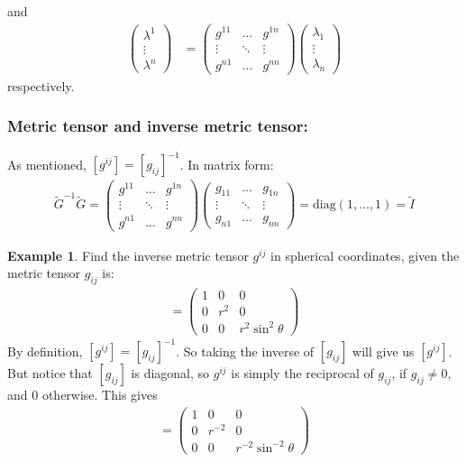 \documentclass{book}
\theoremstyle{definition}
\newtheorem{exmp}{Example}[section]
\begin{document}
and
\begin{align*}
\begin{pmatrix}
\lambda^1 \\
\vdots\\
\lambda^n
\end{pmatrix}
&=
\begin{pmatrix}
g^{11} & \dots & g^{1n}\\
\vdots & \ddots & \vdots\\
g^{n1} & \dots & g^{nn}
\end{pmatrix}
\begin{pmatrix}
\lambda_1\\
\vdots\\
\lambda_n
\end{pmatrix}
\end{align*}
respectively.\\
\subsubsection{Metric tensor and inverse metric tensor:}
As mentioned, $[g^{ij}] = [g_{ij}]^{-1}$. In matrix form:
\begin{align*}
\boxed{
\tilde{G}^{-1}\tilde{G} = 
\begin{pmatrix}
g^{11} & \dots & g^{1n}\\
\vdots & \ddots & \vdots \\
g^{n1} & \dots & g^{nn}
\end{pmatrix}
\begin{pmatrix}
g_{11} & \dots & g_{1n}\\
\vdots & \ddots & \vdots\\
g_{n1} & \dots & g_{nn}
\end{pmatrix}
=
\text{diag}(1,\dots,1) 
=
\tilde{I}
}
\end{align*}
\begin{exmp}
Find the inverse metric tensor $g^{ij}$ in spherical coordinates, given the metric tensor $g_{ij}$ is:
\begin{align*}
[g_{ij}] = 
\begin{pmatrix}
1 & 0 & 0\\
0 & r^2 & 0\\ 
0 & 0 & r^2\sin^2\theta 
\end{pmatrix}
\end{align*}
By definition, $[g^{ij}] = [g_{ij}]^{-1}$. So taking the inverse of $[g_{ij}]$ will give us $[g^{ij}]$. But notice that $[g_{ij}]$ is diagonal, so $g^{ij}$ is simply the reciprocal of $g_{ij}$, if $g_{ij} \neq 0$, and $0$ otherwise. This gives
\begin{align*}
[g^{ij}] = 
\begin{pmatrix}
1 & 0 & 0 \\
0 & r^{-2} & 0\\
0 & 0 & r^{-2}\sin^{-2}\theta
\end{pmatrix}
\end{align*}
\end{exmp}
\end{document}
